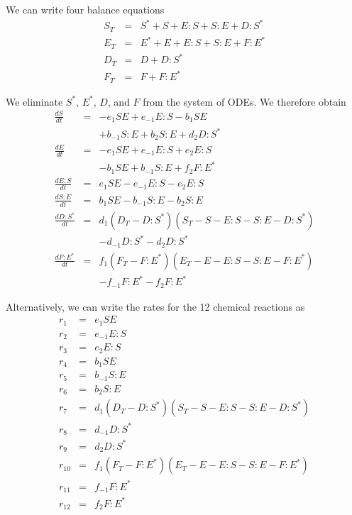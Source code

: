 \documentclass[twocolumn]{revtex4}
\begin{document}
We can write four balance equations 
\begin{equation}
    \begin{array}{rcl}
        S_T & = & S^{*} + S + E:S + S:E + D:S^{*} \\
        E_T & = & E^{*} + E + E:S + S:E + F:E^{*} \\
        D_T & = & D + D:S^{*} \\
        F_T & = & F + F:E^{*} 
    \end{array}
\end{equation}

We eliminate $S^{*}$, $E^{*}$, $D$, and $F$ from the system of ODEs.
%
We therefore obtain
\begin{equation}
    \begin{array}{rcl}
        \frac{d S}{dt} & = & -e_1 S E + e_{-1} E:S -b_1 S E \\
                        &   & + b_{-1} S:E + b_2 S:E + d_2 D:S^{*} \\
        \frac{d E}{dt} & = & -e_1 S E + e_{-1} E:S + e_2 E:S \\
                        &   & - b_1 S E +b_{-1} S:E + f_2 F:E^{*} \\
        \frac{d E:S}{dt}  & = & e_1 S E -e_{-1} E:S -e_2 E:S \\
        \frac{d S:E}{dt}& = & b_1 S E -b_{-1} S:E -b_2 S:E \\
        \frac{d D:S^{*}}{dt} & = & d_1 (D_T - D:S^{*}) (S_T - S - E:S - S:E - D:S^{*}) \\
                            &   & - d_{-1} D:S^{*} -d_2 D:S^{*} \\
        \frac{d F:E^{*}}{dt} & = & f_1 (F_T - F:E^{*}) (E_T - E - E:S - S:E - F:E^{*}) \\
                            &   & - f_{-1} F:E^{*} -f_2 F:E^{*}
    \end{array}
\end{equation}

Alternatively, we can write the rates for the 12 chemical reactions as
\begin{equation}
    \begin{array}{rcl}
        r_1 & = & e_1 S E \\
        r_2 & = & e_{-1} E:S \\
        r_3 & = & e_2 E:S \\
        r_4 & = & b_1 S E \\
        r_5 & = & b_{-1} S:E \\
        r_6 & = & b_2 S:E \\
        r_7 & = & d_1 (D_T - D:S^{*}) (S_T - S - E:S - S:E - D:S^{*}) \\
        r_8 & = & d_{-1} D:S^{*} \\
        r_9 & = & d_2 D:S^{*} \\
        r_{10} & = & f_1 (F_T - F:E^{*}) (E_T - E - E:S - S:E - F:E^{*}) \\
        r_{11} & = & f_{-1} F:E^{*} \\
        r_{12} & = & f_2 F:E^{*}
    \end{array}
\end{equation}
\end{document}
